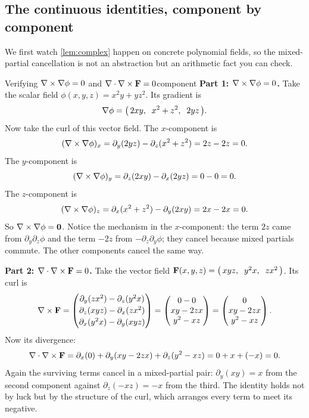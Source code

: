 \subsection{The continuous identities, component by component}

We first watch \cref{lem:complex} happen on concrete polynomial fields, so the
mixed-partial cancellation is not an abstraction but an arithmetic fact you can check.

\begin{workedexample}{Verifying $\nabla\times\nabla\phi=0$ and $\nabla\cdot\nabla\times\mathbf{F}=0$}{component}
\textbf{Part 1: $\nabla\times\nabla\phi=0$.} Take the scalar field
$\phi(x,y,z)=x^2 y + y z^2$. Its gradient is
\[
  \nabla\phi = \bigl(\,2xy,\;\; x^2 + z^2,\;\; 2yz\,\bigr).
\]
Now take the curl of this vector field. The $x$-component is
\[
  (\nabla\times\nabla\phi)_x
  = \partial_y(2yz) - \partial_z(x^2+z^2)
  = 2z - 2z = 0.
\]
The $y$-component is
\[
  (\nabla\times\nabla\phi)_y
  = \partial_z(2xy) - \partial_x(2yz)
  = 0 - 0 = 0.
\]
The $z$-component is
\[
  (\nabla\times\nabla\phi)_z
  = \partial_x(x^2+z^2) - \partial_y(2xy)
  = 2x - 2x = 0.
\]
So $\nabla\times\nabla\phi=\mathbf 0$. Notice the mechanism in the $x$-component: the term
$2z$ came from $\partial_y\partial_z\phi$ and the term $-2z$ from
$-\partial_z\partial_y\phi$; they cancel because mixed partials commute. The other
components cancel the same way.

\textbf{Part 2: $\nabla\cdot\nabla\times\mathbf{F}=0$.} Take the vector field
$\mathbf{F}(x,y,z)=\bigl(\,xy z,\;\; y^2 x,\;\; z x^2\,\bigr)$. Its curl is
\[
  \nabla\times\mathbf{F} =
  \begin{pmatrix}
    \partial_y(z x^2) - \partial_z(y^2 x)\\[2pt]
    \partial_z(x y z) - \partial_x(z x^2)\\[2pt]
    \partial_x(y^2 x) - \partial_y(x y z)
  \end{pmatrix}
  =
  \begin{pmatrix}
    0 - 0\\
    x y - 2 z x\\
    y^2 - x z
  \end{pmatrix}
  =
  \begin{pmatrix}
    0\\ xy - 2zx\\ y^2 - xz
  \end{pmatrix}.
\]
Now its divergence:
\[
  \nabla\cdot\nabla\times\mathbf{F}
  = \partial_x(0) + \partial_y(xy - 2zx) + \partial_z(y^2 - xz)
  = 0 + x + (-x)
  = 0.
\]
Again the surviving terms cancel in a mixed-partial pair: $\partial_y(xy)=x$ from the
second component against $\partial_z(-xz)=-x$ from the third. The identity holds not
by luck but by the structure of the curl, which arranges every term to meet its
negative.
\end{workedexample}

